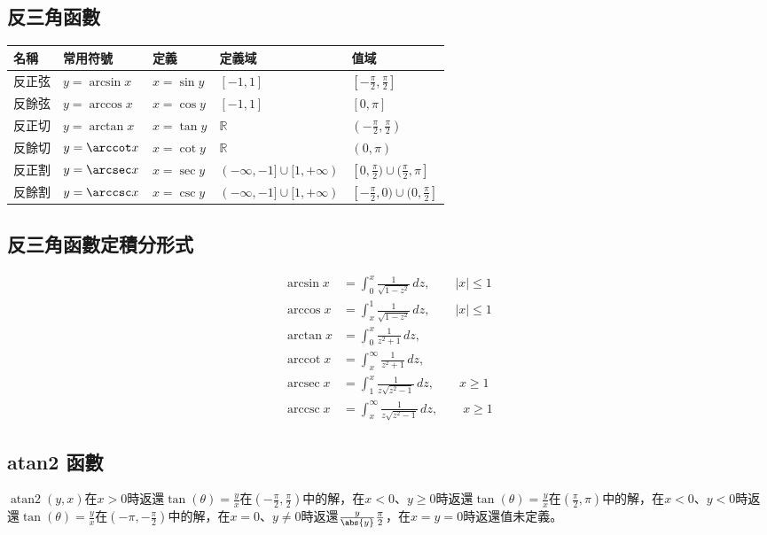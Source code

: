 \documentclass[a4paper,12pt]{report}
\begin{document}
\subsection{反三角函數}
\begin{longtable}[c]{|p{}|p{}|p{}|p{}|p{}|}
\hline
名稱 & 常用符號 & 定義 & 定義域 & 值域 \\ 
\hline\endhead
反正弦 & \(y=\arcsin x\) & \(x=\sin y\) & \([-1,1]\) & \([-\frac{\pi}{2},\frac{\pi}{2}]\) \\ 
\hline
反餘弦 & \(y=\arccos x\) & \(x=\cos y\) & \([-1,1]\) & \([0,\pi]\) \\ 
\hline
反正切 & \(y=\arctan x\) & \(x=\tan y\) & \(\mathbb{R}\) & \((-\frac{\pi}{2},\frac{\pi}{2})\) \\ 
\hline
反餘切 & \(y=\arccot x\) & \(x=\cot y\) & \(\mathbb{R}\) & \((0,\pi)\) \\ 
\hline
反正割 & \(y=\arcsec x\) & \(x=\sec y\) & \((-\infty,-1]\cup[1,+\infty)\) & \([0,\frac{\pi}{2})\cup(\frac{\pi}{2},\pi]\) \\ 
\hline
反餘割 & \(y=\arccsc x\) & \(x=\csc y\) & \((-\infty,-1]\cup[1,+\infty)\) & \([-\frac{\pi}{2},0)\cup(0,\frac{\pi}{2}]\) \\ 
\hline
\end{longtable}
\FB
\subsection{反三角函數定積分形式}
\[{\displaystyle {\begin{aligned}\arcsin x&{}=\int _{0}^{x}{\frac {1}{\sqrt {1-z^{2}}}}\,dz,\qquad |x|\leq 1\\\arccos x&{}=\int _{x}^{1}{\frac {1}{\sqrt {1-z^{2}}}}\,dz,\qquad |x|\leq 1\\\arctan x&{}=\int _{0}^{x}{\frac {1}{z^{2}+1}}\,dz,\\\operatorname {arccot} x&{}=\int _{x}^{\infty }{\frac {1}{z^{2}+1}}\,dz,\\\operatorname {arcsec} x&{}=\int _{1}^{x}{\frac {1}{z{\sqrt {z^{2}-1}}}}\,dz,\qquad x\geq 1\\\operatorname {arccsc} x&{}=\int _{x}^{\infty }{\frac {1}{z{\sqrt {z^{2}-1}}}}\,dz,\qquad x\geq 1\end{aligned}}}\]
\subsection{atan2 函數}
$\operatorname{atan2}(y,x)$在$x>0$時返還$\tan(\theta)=\frac{y}{x}$在$(-\frac{\pi}{2},\frac{\pi}{2})$中的解，在$x<0$、$y\geq 0$時返還$\tan(\theta)=\frac{y}{x}$在$(\frac{\pi}{2},\pi)$中的解，在$x<0$、$y<0$時返還$\tan(\theta)=\frac{y}{x}$在$(-\pi,-\frac{\pi}{2})$中的解，在$x=0$、$y\neq 0$時返還$\frac{y}{\abs{y}}\frac{\pi}{2}$，在$x=y=0$時返還值未定義。
\end{document}
